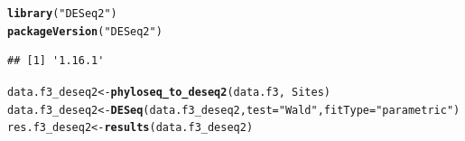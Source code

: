 \documentclass[12pt]{article}\usepackage[]{graphicx}\usepackage[]{color}
\makeatletter
\newcommand{\hlstr}[1]{\textcolor[rgb]{0.192,0.494,0.8}{#1}}%
\newcommand{\hlopt}[1]{\textcolor[rgb]{0,0,0}{#1}}%
\newcommand{\hlstd}[1]{\textcolor[rgb]{0.345,0.345,0.345}{#1}}%
\newcommand{\hlkwb}[1]{\textcolor[rgb]{0.69,0.353,0.396}{#1}}%
\newcommand{\hlkwc}[1]{\textcolor[rgb]{0.333,0.667,0.333}{#1}}%
\newcommand{\hlkwd}[1]{\textcolor[rgb]{0.737,0.353,0.396}{\textbf{#1}}}%
\newenvironment{kframe}{%
 \def\at@end@of@kframe{}%
 \ifinner\ifhmode%
  \def\at@end@of@kframe{\end{minipage}}%
  \begin{minipage}{\columnwidth}%
 \fi\fi%
 \def\FrameCommand##1{\hskip\@totalleftmargin \hskip-\fboxsep
 \colorbox{shadecolor}{##1}\hskip-\fboxsep
     \hskip-\linewidth \hskip-\@totalleftmargin \hskip\columnwidth}%
 \MakeFramed {\advance\hsize-\width
   \@totalleftmargin\z@ \linewidth\hsize
   \@setminipage}}%
 {\par\unskip\endMakeFramed%
 \at@end@of@kframe}
\newenvironment{knitrout}{}{} %
\numberwithin{figure}{section}
\makeatother
\begin{document}
\begin{knitrout}\small
{}\color{fgcolor}\begin{kframe}
\begin{alltt}
\hlkwd{library}\hlstd{(}\hlstr{"DESeq2"}\hlstd{)}
\hlkwd{packageVersion}\hlstd{(}\hlstr{"DESeq2"}\hlstd{)}
\end{alltt}
\begin{verbatim}
## [1] '1.16.1'
\end{verbatim}
\begin{alltt}
\hlstd{data.f3_deseq2} \hlkwb{<-} \hlkwd{phyloseq_to_deseq2}\hlstd{(data.f3,} \hlopt{~} \hlstd{Sites)}
\hlstd{data.f3_deseq2} \hlkwb{<-} \hlkwd{DESeq}\hlstd{(data.f3_deseq2,} \hlkwc{test} \hlstd{=} \hlstr{"Wald"}\hlstd{,} \hlkwc{fitType} \hlstd{=} \hlstr{"parametric"}\hlstd{)}
\hlstd{res.f3_deseq2} \hlkwb{<-} \hlkwd{results}\hlstd{(data.f3_deseq2)}
\end{alltt}
\end{kframe}
\end{knitrout}
\end{document}

